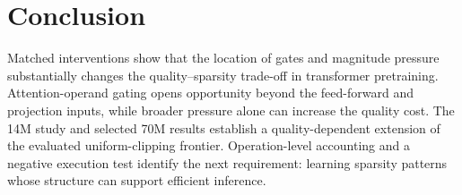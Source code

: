 \section{Conclusion}
Matched interventions show that the location of gates and magnitude pressure
substantially changes the quality--sparsity trade-off in transformer
pretraining. Attention-operand gating opens opportunity beyond the
feed-forward and projection inputs, while broader pressure alone can
increase the quality cost. The 14M study and selected 70M results establish
a quality-dependent extension of the evaluated uniform-clipping frontier.
Operation-level accounting and a negative execution test identify the
next requirement: learning sparsity patterns whose structure can support
efficient inference.
